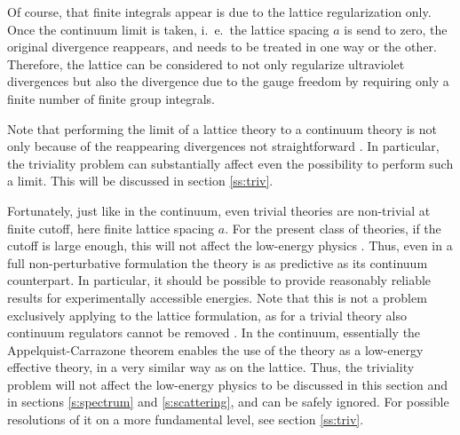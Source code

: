 \documentclass[final,twoside,12pt]{article}
\newcommand*{\1}{1\!\!\!\bot}
\begin{document}
Of course, that finite integrals appear is due to the lattice regularization only. Once the continuum limit is taken, i.\ e.\ the lattice spacing $a$ is send to zero, the original divergence reappears, and needs to be treated in one way or the other. Therefore, the lattice can be considered to not only regularize ultraviolet divergences but also the divergence due to the gauge freedom by requiring only a finite number of finite group integrals.

Note that performing the limit of a lattice theory to a continuum theory is not only because of the reappearing divergences not straightforward \cite{Montvay:1994cy,Gattringer:2010zz,DeGrand:2006zz}. In particular, the triviality problem \cite{Callaway:1988ya} can substantially affect even the possibility to perform such a limit. This will be discussed in section \ref{ss:triv}.

Fortunately, just like in the continuum, even trivial theories are non-trivial at finite cutoff, here finite lattice spacing $a$. For the present class of theories, if the cutoff is large enough, this will not affect the low-energy physics \cite{Hasenfratz:1986za,Kuti:1987nr}. Thus, even in a full non-perturbative formulation the theory is as predictive as its continuum counterpart. In particular, it should be possible to provide reasonably reliable results for experimentally accessible energies. Note that this is not a problem exclusively applying to the lattice formulation, as for a trivial theory also continuum regulators cannot be removed \cite{Callaway:1988ya}. In the continuum, essentially the Appelquist-Carrazone theorem \cite{Bohm:2001yx} enables the use of the theory as a low-energy effective theory, in a very similar way as on the lattice. Thus, the triviality problem will not affect the low-energy physics to be discussed in this section and in sections \ref{s:spectrum} and \ref{s:scattering}, and can be safely ignored. For possible resolutions of it on a more fundamental level, see section \ref{ss:triv}.
\end{document}
